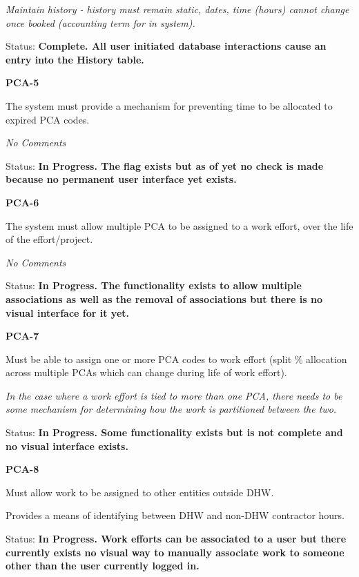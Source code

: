 \documentclass{article}
\begin{document}
\noindent \textit{Maintain history - history must remain static, dates, time (hours) cannot change once booked (accounting term for in system).}

\noindent Status: \textbf{Complete.  All user initiated database interactions cause an entry into the History table.}

\noindent 

\noindent \textbf{PCA-5}

\noindent The system must provide a mechanism for preventing time to be allocated to expired PCA codes.

\textit{No Comments}

\noindent Status: \textbf{In Progress.  The flag exists but as of yet no check is made because no permanent user interface yet exists.}

\noindent 

\noindent \textbf{PCA-6}

\noindent The system must allow multiple PCA to be assigned to a work effort, over the life of the effort/project.

\textit{No Comments}

\noindent Status: \textbf{In Progress.  The functionality exists to allow multiple associations as well as the removal of associations but there is no visual interface for it yet.}

\noindent 

\noindent \textbf{PCA-7}

\noindent Must be able to assign one or more PCA codes to work effort (split \% allocation across multiple PCAs which can change during life of work effort).

\noindent \textit{In the case where a work effort is tied to more than one PCA, there needs to be some mechanism for determining how the work is partitioned between the two.}

\noindent Status: \textbf{In Progress.  Some functionality exists but is not complete and no visual interface exists.}

\noindent 

\noindent \textbf{PCA-8}

\noindent Must allow work to be assigned to other entities outside DHW.

Provides a means of identifying between DHW and non-DHW contractor hours.

\noindent Status: \textbf{In Progress.   Work efforts can be associated to a user but there currently exists no visual way to manually associate work to someone other than the user currently logged in.}
\end{document}
